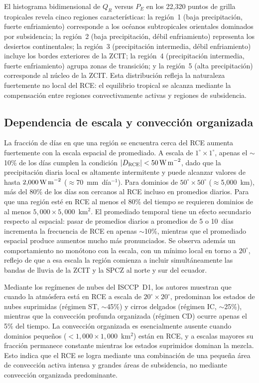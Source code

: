 \documentclass[12pt, a4paper]{article}
\begin{document}
El histograma bidimensional de $Q_R$ versus $P_E$ en los 22{,}320 puntos de grilla tropicales
revela cinco regiones características: la región~1 (baja precipitación, fuerte enfriamiento)
corresponde a los océanos subtropicales orientales dominados por subsidencia; la región~2
(baja precipitación, débil enfriamiento) representa los desiertos continentales; la región~3
(precipitación intermedia, débil enfriamiento) incluye los bordes exteriores de la ZCIT;
la región~4 (precipitación intermedia, fuerte enfriamiento) agrupa zonas de transición; y
la región~5 (alta precipitación) corresponde al núcleo de la ZCIT. Esta distribución refleja
la naturaleza fuertemente no local del RCE: el equilibrio tropical se alcanza mediante la
compensación entre regiones convectivamente activas y regiones de subsidencia.

\subsection{Dependencia de escala y convección organizada}

La fracción de días en que una región se encuentra cerca del RCE aumenta fuertemente con
la escala espacial de promediado. A escala de $1^\circ \times 1^\circ$, apenas el $\sim$10\%
de los días cumplen la condición $|D_{\text{RCE}}| < 50\,\text{W\,m}^{-2}$, dado que la
precipitación diaria local es altamente intermitente y puede alcanzar valores de hasta
$2{,}000\,\text{W\,m}^{-2}$ ($\approx$70~mm~día$^{-1}$). Para dominios de
$50^\circ \times 50^\circ$ ($\approx$5{,}000~km), más del 80\% de los días son cercanos al
RCE incluso en promedios diarios. Para que una región esté en RCE al menos el 80\% del tiempo
se requieren dominios de al menos $5{,}000 \times 5{,}000$~km$^2$. El promediado temporal tiene
un efecto secundario respecto al espacial: pasar de promedios diarios a promedios de 5 o
10~días incrementa la frecuencia de RCE en apenas $\sim$10\%, mientras que el promediado
espacial produce aumentos mucho más pronunciados. Se observa además un comportamiento no
monótono con la escala, con un mínimo local en torno a $20^\circ$, reflejo de que a esa
escala la región comienza a incluir simultáneamente las bandas de lluvia de la ZCIT y la
SPCZ al norte y sur del ecuador.

Mediante los regímenes de nubes del ISCCP~D1, los autores muestran que cuando la atmósfera
está en RCE a escala de $20^\circ \times 20^\circ$, predominan los estados de nubes suprimidas
(régimen ST, $\sim$45\%) y cirros delgados (régimen IC, $\sim$25\%), mientras que la
convección profunda organizada (régimen CD) ocurre apenas el 5\% del tiempo. La convección
organizada es esencialmente ausente cuando dominios pequeños
($< 1{,}000 \times 1{,}000$~km$^2$) están en RCE, y a escalas mayores su fracción permanece
constante mientras los estados suprimidos dominan la mezcla. Esto indica que el RCE se logra
mediante una combinación de una pequeña área de convección activa intensa y grandes áreas
de subsidencia, no mediante convección organizada predominante.
\end{document}

